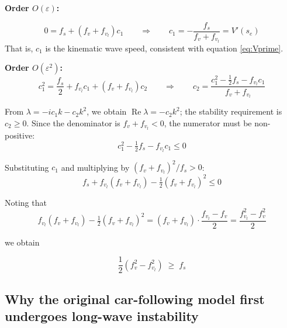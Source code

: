 \documentclass[11pt,a4paper,openany]{book}
\numberwithin{equation}{chapter}
\numberwithin{figure}{chapter}
\numberwithin{table}{chapter}
\begin{document}
\textbf{Order $O(\varepsilon)$:}


\begin{equation}
0 = f_s + \left(f_v+f_{v_l}\right)c_1
\qquad\Longrightarrow\qquad
c_1 = -\frac{f_s}{f_v+f_{v_l}} = V'(s_e)
\end{equation}
That is, $c_1$ is the kinematic wave speed, consistent with equation \eqref{eq:Vprime}.



\textbf{Order $O(\varepsilon^2)$:}\begin{equation}
c_1^2 = \frac{f_s}{2} + f_{v_l}c_1 + \left(f_v+f_{v_l}\right)c_2
\qquad\Longrightarrow\qquad
c_2 = \frac{c_1^2 - \frac12 f_s - f_{v_l}c_1}{f_v+f_{v_l}}
\end{equation}

From $\lambda = -i c_1 k - c_2 k^2$, we obtain $\operatorname{Re}\lambda = -c_2 k^2$; the stability requirement is $c_2\ge 0$. Since the denominator is $f_v+f_{v_l}<0$, the numerator must be non-positive:
\begin{equation}
c_1^2 - \tfrac12 f_s - f_{v_l}c_1 \le 0
\end{equation}

Substituting $c_1$ and multiplying by $\left(f_v+f_{v_l}\right)^2/f_s > 0$:
\begin{equation}
f_s + f_{v_l}\left(f_v+f_{v_l}\right) - \tfrac12\left(f_v+f_{v_l}\right)^2 \le 0
\end{equation}

Noting that
\begin{equation}
f_{v_l}\left(f_v+f_{v_l}\right) - \tfrac12\left(f_v+f_{v_l}\right)^2
= \left(f_v+f_{v_l}\right)\cdot\frac{f_{v_l}-f_v}{2}
= \frac{f_{v_l}^2 - f_v^2}{2}
\end{equation}

we obtain


\begin{tcolorbox}[keybox,title=\textbf{String stability condition (long-wave)}]
\begin{equation}
\frac{1}{2}\left(f_v^2 - f_{v_l}^2\right) \;\ge\; f_s
\label{eq:string}
\end{equation}
\end{tcolorbox}

\subsection{Why the original car-following model first undergoes long-wave instability}\label{sub:why-long-wave-first}
\end{document}
